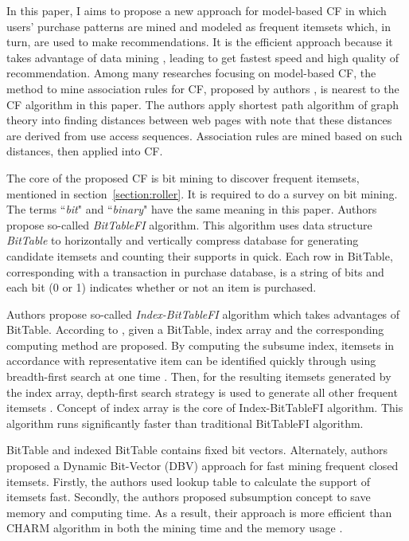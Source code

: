 \documentclass[10pt]{article}
\begin{document}
In this paper, I aims to propose a new approach for model-based CF in which users' purchase patterns are mined and modeled as frequent itemsets which, in turn, are used to make recommendations. It is the efficient approach because it takes advantage of data mining \cite[pp.~227-250]{han:datamining}, leading to get fastest speed and high quality of recommendation. Among many researches focusing on model-based CF, the method to mine association rules for CF, proposed by authors \cite{shyu:associationrules}, is nearest to the CF algorithm in this paper. The authors \cite{shyu:associationrules} apply shortest path algorithm of graph theory into finding distances between web pages with note that these distances are derived from use access sequences. Association rules are mined based on such distances, then applied into CF.

The core of the proposed CF is bit mining to discover frequent itemsets, mentioned in section~\ref{section:roller}. It is required to do a survey on bit mining. The terms ``\textit{bit}" and ``\textit{binary}" have the same meaning in this paper.
Authors \cite{dong:bittablefi} propose so-called \textit{BitTableFI} algorithm. This algorithm uses data structure \textit{BitTable} to horizontally and vertically compress database for generating candidate itemsets and counting their supports in quick. Each row in BitTable, corresponding with a transaction in purchase database, is a string of bits and each bit (0 or 1) indicates whether or not an item is purchased.

Authors \cite{song:indexbittablefi} propose so-called \textit{Index-BitTableFI} algorithm which takes advantages of BitTable. According to \cite[p.~508]{song:indexbittablefi}, given a BitTable, index array and the corresponding computing method are proposed. By computing the subsume index, itemsets in accordance with representative item can be identified quickly through using breadth-first search at one time \cite[p.~509]{song:indexbittablefi}. Then, for the resulting itemsets generated by the index array, depth-first search strategy is used to generate all other frequent itemsets \cite[p.~510]{song:indexbittablefi}. Concept of index array is the core of Index-BitTableFI algorithm. This algorithm runs significantly faster than traditional BitTableFI algorithm.

BitTable and indexed BitTable contains fixed bit vectors. Alternately, authors \cite{vo:dbv-miner} proposed a Dynamic Bit-Vector (DBV) approach for fast mining frequent closed itemsets. Firstly, the authors \cite{vo:dbv-miner} used lookup table to calculate the support of itemsets fast. Secondly, the authors \cite{vo:dbv-miner} proposed subsumption concept to save memory and computing time. As a result, their approach is more efficient than CHARM algorithm in both the mining time and the memory usage \cite{vo:dbv-miner}.
\end{document}

